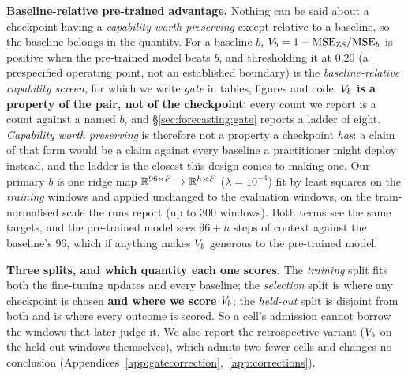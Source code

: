 \textbf{Baseline-relative pre-trained advantage.}  Nothing can be said about a
checkpoint having a \emph{capability worth preserving} except relative to a
baseline, so the baseline belongs in the quantity.  For a baseline
$b$, $V_{b} = 1-\text{MSE}_\text{ZS}/\text{MSE}_b$ is positive when the
pre-trained model beats $b$, and thresholding it at $0.20$ (a prespecified
operating point, not an established boundary) is the \emph{baseline-relative
capability screen}, for which we write \emph{gate} in tables, figures and code.
\textbf{$V_{b}$ is a property of the pair, not of the checkpoint}: every
count we report is a count against a named $b$, and
\S\ref{sec:forecasting:gate} reports a ladder of eight.
\emph{Capability worth preserving} is therefore not a property a checkpoint
\emph{has}: a claim of that form would be a claim against every baseline a
practitioner might deploy instead, and the ladder is the closest this design comes
to making one.  Our primary $b$ is one
ridge map $\mathbb{R}^{96 \times F} \to \mathbb{R}^{h \times F}$ ($\lambda{=}10^{-4}$) fit by
least squares on the \emph{training} windows and applied unchanged to the
evaluation windows, on the train-normalised scale the runs report (up to 300
windows).  Both terms see the same targets, and the pre-trained model sees
$96{+}h$ steps of context against the baseline's $96$, which if anything makes
$V_{b}$ generous to the pre-trained model.

\textbf{Three splits, and which quantity each one scores.} The \emph{training}
split fits both the fine-tuning updates and every baseline; the \emph{selection}
split is where any checkpoint is chosen \textbf{and where we score
$V_{b}$}; the \emph{held-out} split is disjoint from both and is where every
outcome is scored.  So a cell's admission cannot borrow the windows that later
judge it.  We also report the retrospective variant ($V_{b}$ on the held-out
windows themselves), which admits two fewer cells and changes no conclusion
(Appendices~\ref{app:gatecorrection},~\ref{app:corrections}).

